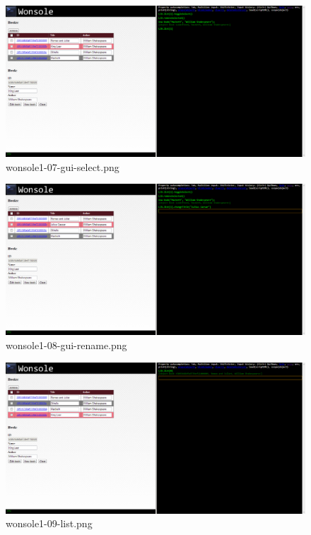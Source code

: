 \clearpage
\begin{figure}
\includegraphics[width=\textwidth]{screenshot/wonsole1-07-gui-select.png}
\caption{wonsole1-07-gui-select.png}
\label{wonsole1-07-gui-select.png}
\end{figure}


\begin{figure}
\includegraphics[width=\textwidth]{screenshot/wonsole1-08-gui-rename.png}
\caption{wonsole1-08-gui-rename.png}
\label{wonsole1-08-gui-rename.png}
\end{figure}


\clearpage
\begin{figure}
\includegraphics[width=\textwidth]{screenshot/wonsole1-09-list.png}
\caption{wonsole1-09-list.png}
\label{wonsole1-09-list.png}
\end{figure}


